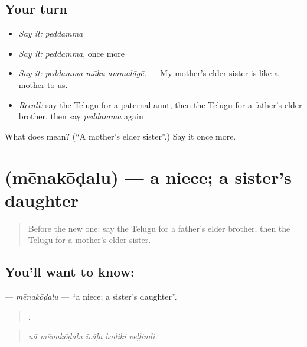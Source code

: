 \subsection*{Your turn}
\begin{itemize}
\raggedright
  \item \emph{Say it:} \emph{peddamma}
  \item \emph{Say it:} \emph{peddamma}, once more
  \item \emph{Say it:} \emph{peddamma māku ammalāgē.} — My mother's elder sister is like a mother to us.
  \item \emph{Recall:} say the Telugu for a paternal aunt, then the Telugu for a father's elder brother, then say \emph{peddamma} again
\end{itemize}

\begin{tcolorbox}[breakable,colback=teal!4,colframe=teal!35!black,title={Before you move on}]
What does  mean? (\textquotedblleft{}A mother's elder sister\textquotedblright{}.) Say it once more.
\end{tcolorbox}
\section[\texorpdfstring{\te{మేనకోడలు} (mēnakōḍalu)}{మేనకోడలు (mēnakōḍalu)}]{ (mēnakōḍalu) — a niece; a sister's daughter}

\label{lesson:TE-C529-menakodalu}



\begin{quote}
Before the new one: say the Telugu for a father's elder brother, then the Telugu for a mother's elder sister.
\end{quote}

\subsection*{You'll want to know: }
\textbf{} — \emph{mēnakōḍalu} — \textquotedblleft{}a niece; a sister's daughter\textquotedblright{}.

\begin{quote}
    .
\end{quote}

\begin{quote}
\emph{nā mēnakōḍalu ivāḷa baḍiki veḷḷindi.}
\end{quote}

